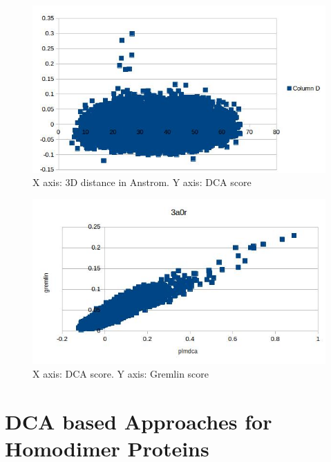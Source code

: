 \documentclass[a4paper,12pt]{article}
\begin{document}
\begin{figure}
\includegraphics[scale=0.4]{3a0r_plmdca.jpg}
\caption{X axis: 3D distance in Anstrom. Y axis: DCA score}
\label{3d_dca}
\end{figure}

\begin{figure}
\includegraphics[scale=0.5]{3a0r_plmdca_gremlin.jpg}
\caption{X axis: DCA score. Y axis: Gremlin score}
\label{dca_gremlin}
\end{figure}





\section*{DCA based Approaches for Homodimer Proteins}
\end{document}
